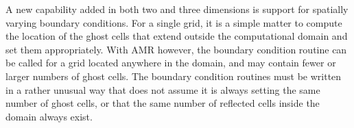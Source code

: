A new capability added in both two and three dimensions is support for
spatially varying boundary conditions.  
For a single grid, it is a simple matter to
compute the location of the ghost cells that extend
outside the computational domain and set them appropriately.
With AMR however, the boundary condition routine can be called
for a grid located anywhere in the domain, and may contain fewer
or larger numbers of ghost cells. The boundary condition routines
must be written in a rather unusual way that does not assume it
is always setting the same number of ghost cells, or that the
same number of reflected cells inside the domain always exist.


